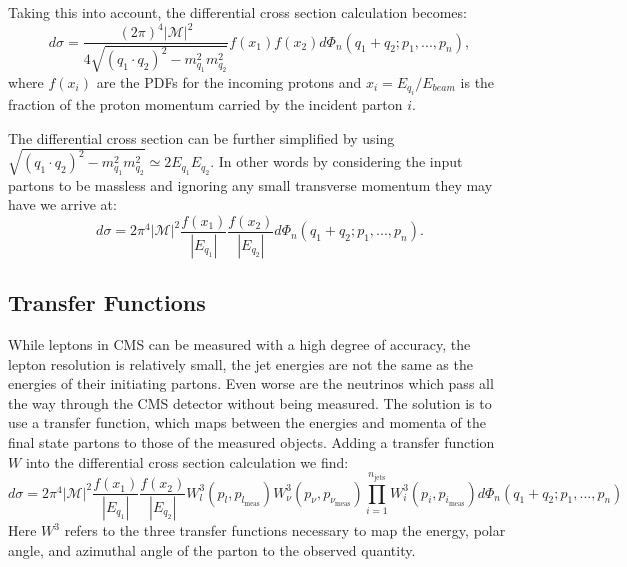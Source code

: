 Taking this into account, the differential cross section calculation becomes:
\begin{equation}
d\sigma=\frac{\left(2\pi\right)^{4}|\mathcal{M}|^{2}}{4\sqrt{\left(q_{1}\cdot{q_{2}}\right)^{2}-m_{q_{1}}^{2}m_{q_{2}}^{2}}}f\left(x_{1}\right)f\left(x_{2}\right)d\Phi_{n}\left(q_{1}+q_{2};p_{1},...,p_{n}\right),
\end{equation}
where $f\left(x_{i}\right)$ are the PDFs for the incoming protons and $x_{i}=E_{q_{i}}/E_{beam}$ is the fraction of the proton momentum carried by the incident parton $i$.

The differential cross section can be further simplified by using $\sqrt{\left(q_{1}{\cdot}q_{2}\right)^{2}-m_{q_{1}}^{2}m_{q_{2}}^{2}}\simeq2E_{q_{1}}E_{q_{2}}$.
In other words by considering the input partons to be massless and ignoring any small transverse momentum they may have we arrive at:
\begin{equation}
d\sigma=2\pi^{4}|\mathcal{M}|^{2}\frac{f\left(x_{1}\right)}{|E_{q_{1}}|}\frac{f\left(x_{2}\right)}{|E_{q_{2}}|}d\Phi_{n}\left(q_{1}+q_{2};p_{1},...,p_{n}\right).
\end{equation}

\subsection{Transfer Functions}

While leptons in CMS can be measured with a high degree of accuracy, the lepton resolution is relatively small, the jet energies are not the same as the energies of their initiating partons.
Even worse are the neutrinos which pass all the way through the CMS detector without being measured.
The solution is to use a transfer function, which maps between the energies and momenta of the final state partons to those of the measured objects.
Adding a transfer function $W$ into the differential cross section calculation we find:
\begin{equation}
d\sigma=2\pi^{4}|\mathcal{M}|^{2}\frac{f\left(x_{1}\right)}{|E_{q_{1}}|}\frac{f\left(x_{2}\right)}{|E_{q_{2}}|}W_{l}^{3}\left(p_{l},p_{l_{\text{meas}}}\right)W_{\nu}^{3}\left(p_{\nu},p_{\nu_{\text{meas}}}\right)\prod_{i=1}^{n_{\text{jets}}}W_{i}^{3}\left(p_{i},p_{i_{\text{meas}}}\right)d\Phi_{n}\left(q_{1}+q_{2};p_{1},...,p_{n}\right)
\end{equation}
Here $W^{3}$ refers to the three transfer functions necessary to map the energy, polar angle, and azimuthal angle of the parton to the observed quantity.

